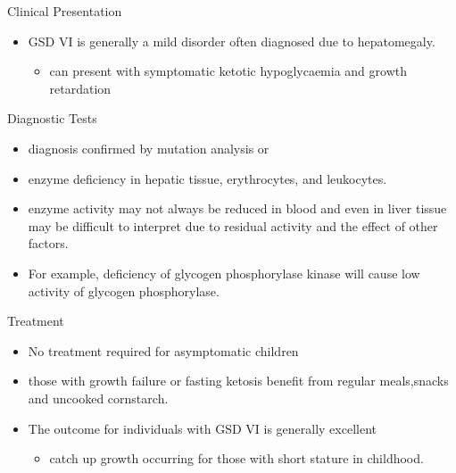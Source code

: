 \documentclass[presentation, smaller]{beamer}
\begin{document}
\begin{frame}[label={sec:org27144e0}]{Clinical Presentation}
\begin{itemize}
\item GSD VI is generally a mild disorder often diagnosed due to hepatomegaly.
\begin{itemize}
\item can present with symptomatic ketotic hypoglycaemia and growth retardation
\end{itemize}
\end{itemize}
\end{frame}
\begin{frame}[label={sec:orgd7662c1}]{Diagnostic Tests}
\begin{itemize}
\item diagnosis confirmed by mutation analysis or
\item enzyme deficiency in hepatic tissue, erythrocytes, and leukocytes.
\item enzyme activity may not always be reduced in blood and even in liver
tissue may be difficult to interpret due to residual activity and
the effect of other factors.
\item For example, deficiency of glycogen phosphorylase kinase will cause
low activity of glycogen phosphorylase.
\end{itemize}
\end{frame}
\begin{frame}[label={sec:orgbf268a4}]{Treatment}
\begin{itemize}
\item No treatment required for asymptomatic children
\item those with growth failure or fasting ketosis benefit from regular
meals,snacks and uncooked cornstarch.
\item The outcome for individuals with GSD VI is generally excellent
\begin{itemize}
\item catch up growth occurring for those with short stature in childhood.
\end{itemize}
\end{itemize}
\end{frame}
\end{document}
